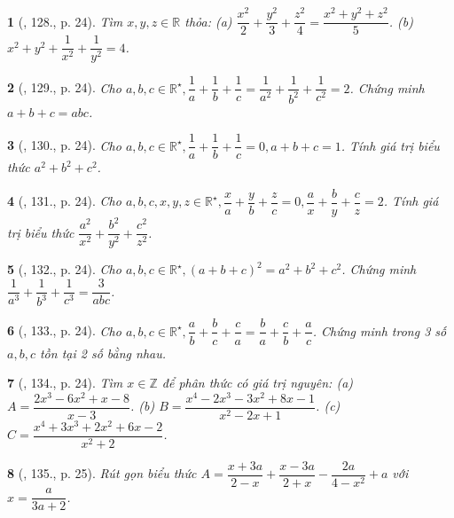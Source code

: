 \documentclass{article}
\newtheorem{baitoan}{}
\begin{document}
\begin{baitoan}[\cite{Binh_Toan_8_tap_1}, 128., p. 24]
	Tìm $x,y,z\in\mathbb{R}$ thỏa: (a) $\dfrac{x^2}{2} + \dfrac{y^2}{3} + \dfrac{z^2}{4} = \dfrac{x^2 + y^2 + z^2}{5}$. (b) $x^2 + y^2 + \dfrac{1}{x^2} + \dfrac{1}{y^2} = 4$.
\end{baitoan}

\begin{baitoan}[\cite{Binh_Toan_8_tap_1}, 129., p. 24]
	Cho $a,b,c\in\mathbb{R}^\star,\dfrac{1}{a} + \dfrac{1}{b} + \dfrac{1}{c} = \dfrac{1}{a^2} + \dfrac{1}{b^2} + \dfrac{1}{c^2} = 2$. Chứng minh $a + b + c = abc$.
\end{baitoan}

\begin{baitoan}[\cite{Binh_Toan_8_tap_1}, 130., p. 24]
	Cho $a,b,c\in\mathbb{R}^\star,\dfrac{1}{a} + \dfrac{1}{b} + \dfrac{1}{c} = 0,a + b + c = 1$. Tính giá trị biểu thức $a^2 + b^2 + c^2$.
\end{baitoan}

\begin{baitoan}[\cite{Binh_Toan_8_tap_1}, 131., p. 24]
	Cho $a,b,c,x,y,z\in\mathbb{R}^\star,\dfrac{x}{a} + \dfrac{y}{b} + \dfrac{z}{c} = 0,\dfrac{a}{x} + \dfrac{b}{y} + \dfrac{c}{z} = 2$. Tính giá trị biểu thức $\dfrac{a^2}{x^2} + \dfrac{b^2}{y^2} + \dfrac{c^2}{z^2}$.
\end{baitoan}

\begin{baitoan}[\cite{Binh_Toan_8_tap_1}, 132., p. 24]
	Cho $a,b,c\in\mathbb{R}^\star,(a + b + c)^2 = a^2 + b^2 + c^2$. Chứng minh $\dfrac{1}{a^3} + \dfrac{1}{b^3} + \dfrac{1}{c^3} = \dfrac{3}{abc}$.
\end{baitoan}

\begin{baitoan}[\cite{Binh_Toan_8_tap_1}, 133., p. 24]
	Cho $a,b,c\in\mathbb{R}^\star,\dfrac{a}{b} + \dfrac{b}{c} + \dfrac{c}{a} = \dfrac{b}{a} + \dfrac{c}{b} + \dfrac{a}{c}$. Chứng minh trong 3 số $a,b,c$ tồn tại 2 số bằng nhau.
\end{baitoan}

\begin{baitoan}[\cite{Binh_Toan_8_tap_1}, 134., p. 24]
	Tìm $x\in\mathbb{Z}$ để phân thức có giá trị nguyên: (a) $A = \dfrac{2x^3 - 6x^2 + x - 8}{x - 3}$. (b) $B = \dfrac{x^4 - 2x^3 - 3x^2 + 8x - 1}{x^2 - 2x + 1}$. (c) $C = \dfrac{x^4 + 3x^3 + 2x^2 + 6x - 2}{x^2 + 2}$.
\end{baitoan}

\begin{baitoan}[\cite{Binh_Toan_8_tap_1}, 135., p. 25]
	Rút gọn biểu thức $A = \dfrac{x + 3a}{2 - x} + \dfrac{x - 3a}{2 + x} - \dfrac{2a}{4 - x^2} + a$ với $x = \dfrac{a}{3a + 2}$.
\end{baitoan}
\end{document}
